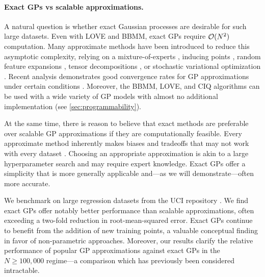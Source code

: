 \paragraph{Exact GPs vs scalable approximations.}
A natural question is whether exact Gaussian processes are desirable for such large datasets.
Even with LOVE and BBMM, exact GPs require $\bigo{N^2}$ computation.
Many approximate methods have been introduced to reduce this asymptotic complexity, relying on a mixture-of-experts \cite{deisenroth2015distributed}, inducing points \citep{snelson2006sparse,titsias2009variational,wilson2015kernel,gardner2018product},
random feature expansions \cite{rahimi2008random,le2013fastfood,yang2015carte},
tensor decompositions \cite{izmailov2018scalable,evans2018scalable},
or stochastic variational optimization \citep{hensman2013gaussian,hensman2015scalable,wilson2016stochastic,cheng2017variational,salimbeni2018orthogonally,shi2019sparse}.
Recent analysis demonstrates good convergence rates for GP approximations under certain conditions \cite{burt2019rates}.
Moreover, the BBMM, LOVE, and CIQ algorithms can be used with a wide variety of GP models with almost no additional implementation (see \cref{sec:programmability}).

At the same time, there is reason to believe that exact methods are preferable over scalable GP approximations if they are computationally feasible.
Every approximate method inherently makes biases and tradeoffs that may not work with every dataset \cite{turner2011two,bauer2016understanding}.
Choosing an appropriate approximation is akin to a large hyperparameter search and may require expert knowledge.
Exact GPs offer a simplicity that is more generally applicable and---as we will demonstrate---often more accurate.

We benchmark on large regression datasets from the UCI repository \citep{asuncion2007uci}.
We find exact GPs offer notably better performance than scalable approximations, often exceeding a two-fold reduction in root-mean-squared error.
Exact GPs continue to benefit from the addition of new training points, a valuable conceptual finding in favor of non-parametric approaches.
Moreover, our results clarify the relative performance of popular GP approximations against exact GPs in the $N\geq100,\!000$ regime---a comparison which has previously been considered intractable.


